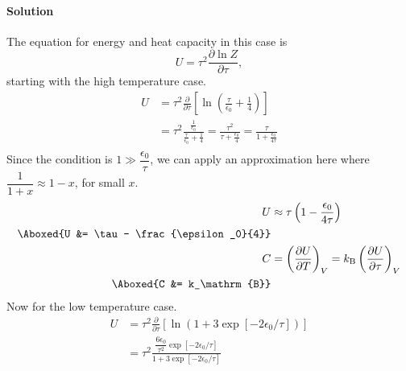 \documentclass{article}
\begin{document}
\begin{enumerate}
		\paragraph{Solution} The equation for energy and heat capacity in this case is
		\begin{equation}
			U = \tau^2 \frac{\partial \ln Z}{\partial \tau},
		\end{equation}
		starting with the high temperature case.
		\begin{equation}
			\begin{split}
				U &= \tau^2 \frac{\partial}{\partial \tau} \left[ \ln(\frac{\tau}{\epsilon_0} + \frac{1}{4}) \right] \\
				  &= \tau^2 \frac{\frac{1}{\epsilon_0}}{\frac{\tau}{\epsilon_0} + \frac{1}{4}} = \frac{\tau^2}{\tau + \frac{\epsilon_0}{4}} = \frac{\tau}{1 + \frac{\epsilon_0}{4\tau}} \\
			\end{split}
		\end{equation}
		Since the condition is $1 \gg \dfrac{\epsilon_0}{\tau}$, we can apply an approximation here where $\dfrac{1}{1 + x} \approx 1 - x$, for small $x$.
		\begin{equation}
			\begin{split}
				U &\approx \tau \left( 1 - \frac{\epsilon_0}{4\tau} \right) \\
				\Aboxed{U &= \tau - \frac{\epsilon_0}{4}} \\
				C &= \left( \frac{\partial U}{\partial T} \right)_V = k_\mathrm{B} \left( \frac{\partial U}{\partial \tau} \right)_V \\
				\Aboxed{C &= k_\mathrm{B}} 
			\end{split}
		\end{equation}
		Now for the low temperature case.
		\begin{equation}
			\begin{split}
				U &= \tau^2 \frac{\partial}{\partial \tau} \left[ \ln(1 + 3\exp\left[ -2\epsilon_0/\tau \right]) \right] \\
				&= \tau^2 \frac{ \dfrac{6\epsilon_0}{\tau^2}\exp\left[ -2\epsilon_0/\tau \right]}{1 + 3\exp\left[ -2\epsilon_0/\tau \right]} \\

\end{split}
\end{equation}
\end{enumerate}
\end{document}
